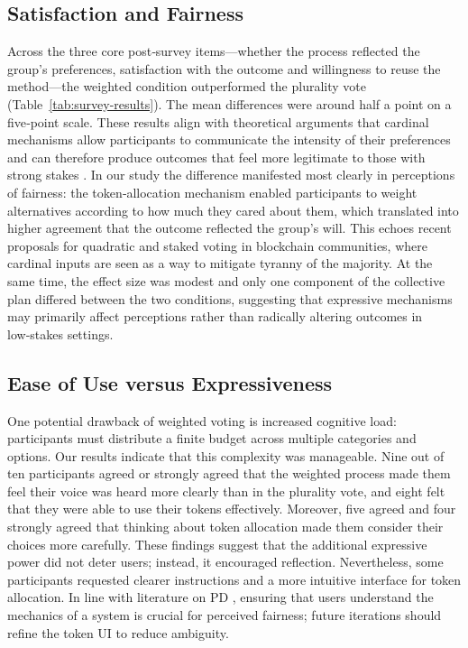 \subsection*{Satisfaction and Fairness}
Across the three core post‑survey items—whether the process reflected the group’s preferences, satisfaction with the outcome and willingness to reuse the method—the weighted condition outperformed the plurality vote (Table~\ref{tab:survey-results}).  The mean differences were around half a point on a five‑point scale.  These results align with theoretical arguments that cardinal mechanisms allow participants to communicate the intensity of their preferences and can therefore produce outcomes that feel more legitimate to those with strong stakes \cite{Okasha2011}.  In our study the difference manifested most clearly in perceptions of fairness: the token‑allocation mechanism enabled participants to weight alternatives according to how much they cared about them, which translated into higher agreement that the outcome reflected the group’s will.  This echoes recent proposals for quadratic and staked voting in blockchain communities, where cardinal inputs are seen as a way to mitigate tyranny of the majority.  At the same time, the effect size was modest and only one component of the collective plan differed between the two conditions, suggesting that expressive mechanisms may primarily affect perceptions rather than radically altering outcomes in low‑stakes settings.

\subsection*{Ease of Use versus Expressiveness}
One potential drawback of weighted voting is increased cognitive load: participants must distribute a finite budget across multiple categories and options.  Our results indicate that this complexity was manageable.  Nine out of ten participants agreed or strongly agreed that the weighted process made them feel their voice was heard more clearly than in the plurality vote, and eight felt that they were able to use their tokens effectively.  Moreover, five agreed and four strongly agreed that thinking about token allocation made them consider their choices more carefully.  These findings suggest that the additional expressive power did not deter users; instead, it encouraged reflection.  Nevertheless, some participants requested clearer instructions and a more intuitive interface for token allocation.  In line with literature on PD \cite{Schuler1993PD}, ensuring that users understand the mechanics of a system is crucial for perceived fairness; future iterations should refine the token UI to reduce ambiguity.

